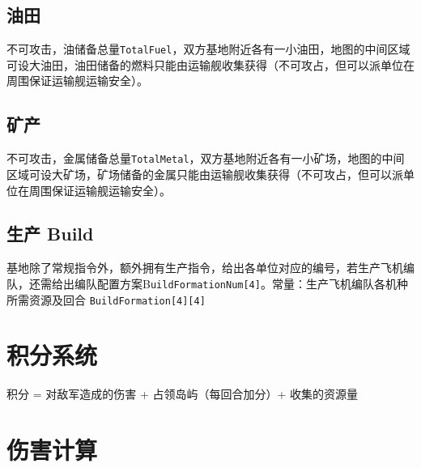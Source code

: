 \documentclass[11pt,a4paper]{article}
\begin{document}
    \subsection{油田}
      不可攻击，油储备总量\texttt{TotalFuel}，双方基地附近各有一小油田，地图的中间区域可设大油田，油田储备的燃料只能由运输舰收集获得（不可攻占，但可以派单位在周围保证运输舰运输安全）。

    \subsection{矿产}
      不可攻击，金属储备总量\texttt{TotalMetal}，双方基地附近各有一小矿场，地图的中间区域可设大矿场，矿场储备的金属只能由运输舰收集获得（不可攻占，但可以派单位在周围保证运输舰运输安全）。

    \subsection{生产 Build}
      基地除了常规指令外，额外拥有生产指令，给出各单位对应的编号，若生产飞机编队，还需给出编队配置方案B\texttt{uildFormationNum[4]}。常量：生产飞机编队各机种所需资源及回合 \texttt{BuildFormation[4][4]}


  \section{积分系统}
  \label{sec:score-system}
    积分 = 对敌军造成的伤害 + 占领岛屿（每回合加分）+ 收集的资源量


  \section{伤害计算}
\end{document}
